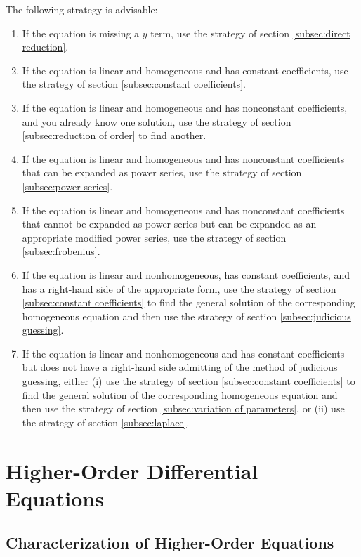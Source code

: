 \documentclass{myart}
\begin{document}
The following strategy is advisable:
\begin{enumerate}
\item If the equation is missing a $y$ term, use the strategy of
  section \ref{subsec:direct reduction}.
\item If the equation is linear and homogeneous and has constant
  coefficients, use the strategy of section \ref{subsec:constant
    coefficients}.
\item If the equation is linear and homogeneous and has nonconstant
  coefficients, and you already know one solution, use the strategy of
  section \ref{subsec:reduction of order} to find another.
\item If the equation is linear and homogeneous and has nonconstant
  coefficients that can be expanded as power series, use the strategy
  of section \ref{subsec:power series}.
\item If the equation is linear and homogeneous and has nonconstant
  coefficients that cannot be expanded as power series but can be
  expanded as an appropriate modified power series, use the strategy
  of section \ref{subsec:frobenius}.
\item If the equation is linear and nonhomogeneous, has constant
  coefficients, and has a right-hand side of the appropriate form, use
  the strategy of section \ref{subsec:constant coefficients} to find
  the general solution of the corresponding homogeneous equation and
  then use the strategy of section \ref{subsec:judicious guessing}.
\item If the equation is linear and nonhomogeneous and has constant
  coefficients but does not have a right-hand side admitting of the
  method of judicious guessing, either (i) use the strategy of section
  \ref{subsec:constant coefficients} to find the general solution of
  the corresponding homogeneous equation and then use the strategy of
  section \ref{subsec:variation of parameters}, or (ii) use the
  strategy of section \ref{subsec:laplace}.
\end{enumerate}

\section{Higher-Order Differential Equations}
\label{sec:higher order}

\subsection{Characterization of Higher-Order Equations}
\label{subsec:higher order characterization}
\end{document}
